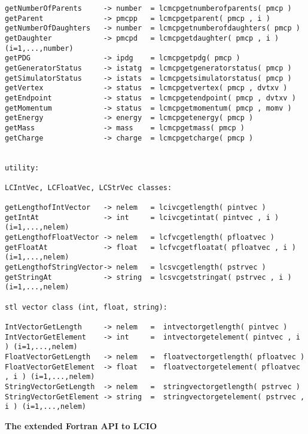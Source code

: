 \begin{scriptsize}
\begin{verbatim}
getNumberOfParents     -> number  = lcmcpgetnumberofparents( pmcp )
getParent              -> pmcpp   = lcmcpgetparent( pmcp , i )
getNumberOfDaughters   -> number  = lcmcpgetnumberofdaughters( pmcp )
getDaughter            -> pmcpd   = lcmcpgetdaughter( pmcp , i )  (i=1,...,number)
getPDG                 -> ipdg    = lcmcpgetpdg( pmcp )
getGeneratorStatus     -> istatg  = lcmcpgetgeneratorstatus( pmcp )
getSimulatorStatus     -> istats  = lcmcpgetsimulatorstatus( pmcp )
getVertex              -> status  = lcmcpgetvertex( pmcp , dvtxv )
getEndpoint            -> status  = lcmcpgetendpoint( pmcp , dvtxv )
getMomentum            -> status  = lcmcpgetmomentum( pmcp , momv )
getEnergy              -> energy  = lcmcpgetenergy( pmcp )
getMass                -> mass    = lcmcpgetmass( pmcp )
getCharge              -> charge  = lcmcpgetcharge( pmcp )


utility: 

LCIntVec, LCFloatVec, LCStrVec classes:

getLengthofIntVector   -> nelem   = lcivcgetlength( pintvec )
getIntAt               -> int     = lcivcgetintat( pintvec , i ) (i=1,...,nelem)
getLengthofFloatVector -> nelem   = lcfvcgetlength( pfloatvec )
getFloatAt             -> float   = lcfvcgetfloatat( pfloatvec , i ) (i=1,...,nelem)
getLengthofStringVector-> nelem   = lcsvcgetlength( pstrvec )
getStringAt            -> string  = lcsvcgetstringat( pstrvec , i ) (i=1,...,nelem)

stl vector class (int, float, string):

IntVectorGetLength     -> nelem   =  intvectorgetlength( pintvec )
IntVectorGetElement    -> int     =  intvectorgetelement( pintvec , i ) (i=1,...,nelem)
FloatVectorGetLength   -> nelem   =  floatvectorgetlength( pfloatvec )
FloatVectorGetElement  -> float   =  floatvectorgetelement( pfloatvec , i ) (i=1,...,nelem)
StringVectorGetLength  -> nelem   =  stringvectorgetlength( pstrvec )
StringVectorGetElement -> string  =  stringvectorgetelement( pstrvec , i ) (i=1,...,nelem)

\end{verbatim}

\end{scriptsize}



\newpage
{\large\bf The extended Fortran API to LCIO} \\

